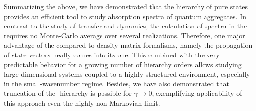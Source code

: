 Summarizing the above, we have demonstrated that the hierarchy of pure states provides an efficient tool to study absorption spectra of quantum aggregates.
In contrast to the study of transfer and dynamics, the calculation of spectra in the \NMSSE requires no Monte-Carlo average over several realizations.
Therefore, one major advantage of the \NMSSE compared to density-matrix formalisms, namely the propagation of state vectors, really comes into its one.
This combined with the very predictable behavior for a growing number of hierarchy orders allows studying large-dimensional systems coupled to a highly structured environment, especially in the small-wavenumber regime.
Besides, we have also demonstrated that truncation of the \NMSSE-hierarchy is possible for $\gamma \to 0$, exemplifying applicability of this approach even the highly non-Markovian limit.
